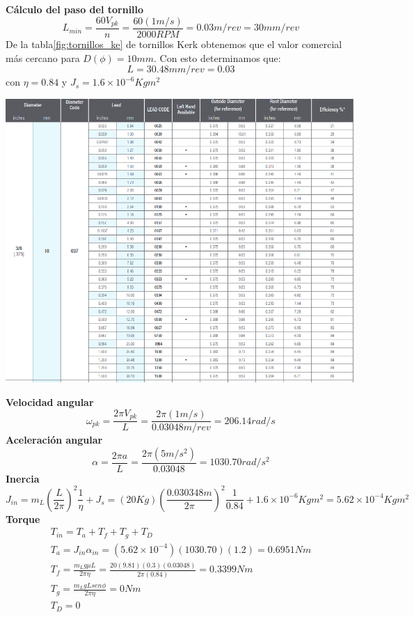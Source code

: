 \textbf{Cálculo del paso del tornillo}
\begin{equation}
    L_{min}=\frac{60V_{pk}}{n}=\frac{60(1m/s)}{2000RPM}=0.03m/rev = 30mm/rev
\end{equation}
De la tabla\ref{fig:tornillos_ke} de tornillos Kerk obtenemos que el valor comercial más cercano para $D(\phi)=10mm$. Con esto determinamos que:
\begin{equation}
    L = 30.48 mm/rev = 0.03
\end{equation}
con $\eta = 0.84$ y $J_s = 1.6\times 10^{-6} Kgm^2$
\begin{center}
    \includegraphics[scale=0.4]{imagenes/tornillos kerk.png}
    \label{fig:tornillos_ke}
\end{center}
\textbf{Velocidad angular}
\begin{equation}
    \omega_{pk}=\frac{2\pi V_{pk}}{L}=\frac{2\pi (1 m/s)}{0.03048 m/rev} = 206.14rad/s
\end{equation}
\textbf{Aceleración angular}
\begin{equation}
    \alpha = \frac{2\pi a}{L}=\frac{2\pi (5m/s^2)}{0.03048}=1030.70rad/s^2
\end{equation}
\textbf{Inercia}
\begin{equation}
    J_{in}=m_L(\frac{L}{2\pi})^2\frac{1}{\eta}+J_s=(20Kg)(\frac{0.030348m}{2\pi})^2\frac{1}{0.84}+1.6\times 10^{-6}Kgm^2=5.62\times 10^{-4}Kgm^2
\end{equation}
\textbf{Torque}
\begin{align}
    T_{in}=T_a + T_f + T_g + T_D \\
    T_a = J_{in}\alpha_{in}=(5.62\times 10^{-4})(1030.70)(1.2)=0.6951Nm \\
    T_f = \frac{m_Lg\mu L}{2\pi \eta}=\frac{20(9.81)(0.3)(0.03048)}{2\pi (0.84)}=0.3399Nm \\
    T_g = \frac{m_LgLsen\phi}{2\pi \eta}=0Nm \\
    T_D = 0
\end{align}
